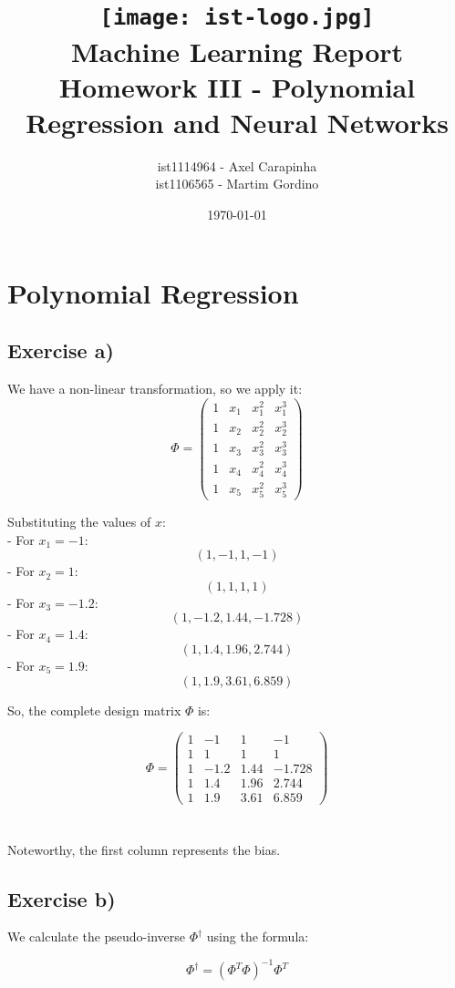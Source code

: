 \documentclass{article}
\title{
\texttt{[image: ist-logo.jpg]}\\[1ex] %
Machine Learning Report \\ 
\large Homework III - Polynomial Regression and Neural Networks
}
\author{ist1114964 - Axel Carapinha \\ ist1106565 - Martim Gordino}
\date{\today}
\begin{document}
\maketitle
\tableofcontents
\newpage

\section{Polynomial Regression}
\subsection{Exercise a)}
We have a non-linear transformation, so we apply it:
\[
\Phi = \begin{pmatrix}
1 & x_1 & x_1^2 & x_1^3 \\
1 & x_2 & x_2^2 & x_2^3 \\
1 & x_3 & x_3^2 & x_3^3 \\
1 & x_4 & x_4^2 & x_4^3 \\
1 & x_5 & x_5^2 & x_5^3
\end{pmatrix}
\]

Substituting the values of \( x \):
\\
- For \( x_1 = -1 \):
  \[
  (1, -1, 1, -1)
  \]
- For \( x_2 = 1 \):
  \[
  (1, 1, 1, 1)
  \]
- For \( x_3 = -1.2 \):
  \[
  (1, -1.2, 1.44, -1.728)
  \]
- For \( x_4 = 1.4 \):
  \[
  (1, 1.4, 1.96, 2.744)
  \]
- For \( x_5 = 1.9 \):
  \[
  (1, 1.9, 3.61, 6.859)
  \]


So, the complete design matrix \( \Phi \) is:

\[
\Phi = 
\begin{pmatrix}
1 & -1 & 1 & -1 \\
1 & 1 & 1 & 1 \\
1 & -1.2 & 1.44 & -1.728 \\
1 & 1.4 & 1.96 & 2.744 \\
1 & 1.9 & 3.61 & 6.859
\end{pmatrix}
\]
\\
\\
Noteworthy, the first column represents the bias.

\subsection{Exercise b)}

We calculate the pseudo-inverse \( \Phi^\dagger \) using the formula:

\[
\Phi^\dagger = \left( \Phi^T \Phi \right)^{-1} \Phi^T
\]
\end{document}
